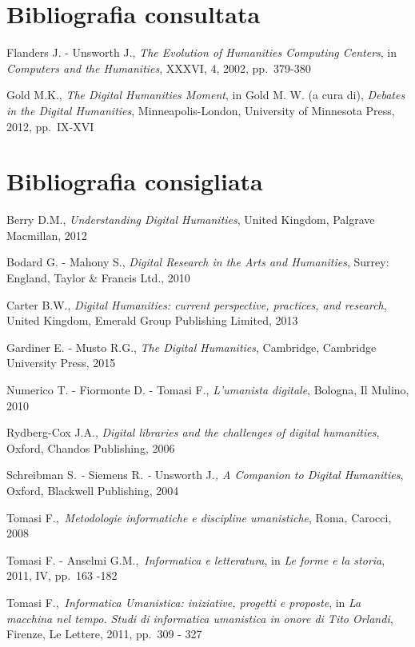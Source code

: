 \documentclass[
  b5paper,
  twoside,
  12pt,
  chapterprefix=false,
  bibliography=totocnumbered,
  parskip=false]{scrbook}
\begin{document}
\hypertarget{bibliografia-consultata-4}{%
\section*{Bibliografia consultata}\label{bibliografia-consultata-4}}

Flanders J. - Unsworth J., \emph{The Evolution of Humanities Computing
Centers}, in \emph{Computers and the Humanities}, XXXVI, 4, 2002, pp.~379-380

Gold M.K., \emph{The Digital Humanities Moment}, in Gold M. W. (a cura di),
\emph{Debates in the Digital Humanities}, Minneapolis-London, University of
Minnesota Press, 2012, pp.~IX-XVI

\hypertarget{bibliografia-consigliata-13}{%
\section*{Bibliografia consigliata}\label{bibliografia-consigliata-13}}

Berry D.M., \emph{Understanding Digital Humanities}, United Kingdom, Palgrave
Macmillan, 2012

Bodard G. - Mahony S., \emph{Digital Research in the Arts and Humanities},
Surrey: England, Taylor \& Francis Ltd., 2010

Carter B.W., \emph{Digital Humanities: current perspective, practices, and
research}, United Kingdom, Emerald Group Publishing Limited, 2013

Gardiner E. - Musto R.G., \emph{The Digital Humanities}, Cambridge, Cambridge
University Press, 2015

Numerico T. - Fiormonte D. - Tomasi F., \emph{L'umanista digitale}, Bologna,
Il Mulino, 2010

Rydberg-Cox J.A., \emph{Digital libraries and the challenges of digital
humanities}, Oxford, Chandos Publishing, 2006

Schreibman S\emph{. -} Siemens R\emph{. -} Unsworth J.\emph{, A Companion to Digital
Humanities}, Oxford, Blackwell Publishing, 2004

Tomasi F.,~\emph{Metodologie informatiche e discipline umanistiche}, Roma,
Carocci, 2008

Tomasi F. - Anselmi G.M.,~\emph{Informatica e letteratura}, in \emph{Le forme e la
storia}, 2011, IV, pp.~163 -182

Tomasi F.,~\emph{Informatica Umanistica: iniziative, progetti e proposte}, in
\emph{La macchina nel tempo. Studi di informatica umanistica in onore di Tito
Orlandi}, Firenze, Le Lettere, 2011, pp.~309 - 327
\end{document}
